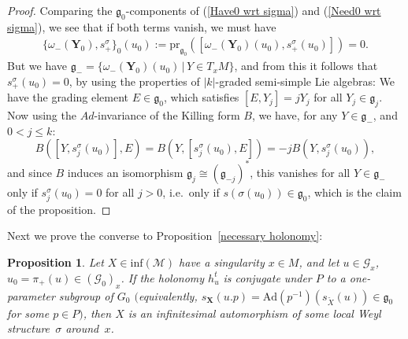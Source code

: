 \documentclass[pdftex]{sigma}
\def\g{\mathfrak{g}}
\def\Gbdle{\mathcal{G}}
\theoremstyle{plain}
\newtheorem{Proposition}[Theorem]{Proposition}
\theoremstyle{definition}
\begin{document}
\begin{proof}
 Comparing the $\g_0$-components of (\ref{Have0 wrt sigma}) and (\ref{Need0 wrt sigma}), we see that if both terms vanish, we must have
\begin{gather*}
\{\omega_{-}(\mathbf{Y}_0),s^{\sigma}_+\}_0(u_0) := \mathrm{pr}_{\g_0}([\omega_{-}(\mathbf{Y}_0)(u_0),s^{\sigma}_+(u_0)]) = 0.
\end{gather*}
But we have $\g_- = \{\omega_{-}(\mathbf{Y}_0)(u_0) \, \vert \, Y \in T_xM\}$, and from this it follows that $s^{\sigma}_+(u_0) = 0$, by using the properties of $\vert k \vert$-graded semi-simple Lie algebras: We have the grading element $E \in \g_0$, which satisf\/ies $[E,Y_j] = jY_j$ for all $Y_j \in \g_j$. Now using the $Ad$-invariance of the Killing form $B$, we have, for any $Y \in \g_-$, and $0 < j \leq k$:
\[
B([Y,s^{\sigma}_j(u_0)],E) = B(Y,[s^{\sigma}_j(u_0),E]) = -jB(Y,s^{\sigma}_j(u_0)),
\]
and since $B$ induces an isomorphism $\g_j \cong (\g_{-j})^*$, this vanishes for all $Y \in \g_-$ only if $s^{\sigma}_j(u_0) = 0$ for all $j > 0$, i.e.\ only if $s(\sigma(u_0)) \in \g_0$, which is the claim of the proposition.
\end{proof}

Next we prove the converse to Proposition~\ref{necessary holonomy}:

\begin{Proposition} \label{sufficient holonomy} Let $X \in \mathrm{inf}(\mathcal{M})$ have a singularity $x \in M$, and let $u \in \Gbdle_x$, $u_0 = \pi_+(u) \in (\Gbdle_0)_x$. If the holonomy $h_u^t$ is conjugate under $P$ to a one-parameter subgroup of $G_0$ $($equivalently, $s_{\mathbf{X}}(u.p) = \mathrm{Ad}(p^{-1})(s_{\tilde{X}}(u)) \in \g_0$ for some $p \in P)$, then $X$ is an infinitesimal automorphism of some local Weyl structure~$\sigma$ around~$x$.
\end{Proposition}
\end{document}
